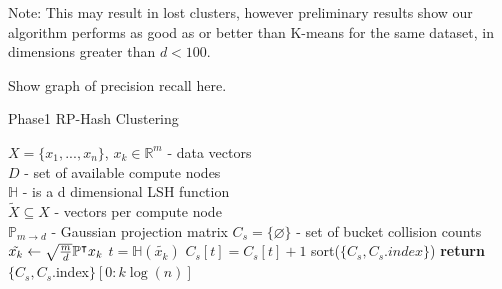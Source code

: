 \documentclass[a4paper,10pt]{article}
\begin{document}
Note: This may result in lost clusters, however preliminary results show our algorithm performs
as good as or better than K-means for the same dataset, in dimensions greater than $d<100$.

Show graph of precision recall here.

%

\begin{algorithm}
\caption{Phase1 RP-Hash Clustering}\label{Phase1}
\begin{algorithmic}[1]
\REQUIRE $X=\{x_1,...,x_n\}$, $x_k \in \mathbb{R}^m$ - data vectors\\
 $D$ - set of available compute nodes\\
$\mathbb{H}$ - is a d dimensional LSH function\\
 $\widetilde{X} \subseteq X$ - vectors per compute node\\
 $\mathbb{P}_{m\rightarrow d}$ - Gaussian projection matrix
\STATE $C_s=\{\varnothing\}$ - set of bucket collision counts
\STATE $\tilde{x_k}\leftarrow \sqrt{{m}\over{d}}\mathbb{P}^{\intercal}x_k $
\STATE $t = \mathbb{H}(\tilde{x_k})$
\STATE $C_s[t]=C_s[t]+1$
\ENDFOR
\STATE sort($\{C_s,C_s.index\}$)
\State \textbf{return}$\{C_s,C_s$.index$\} [0 : k\log(n)]$
\end{algorithmic}
\end{algorithm}
\end{document}

